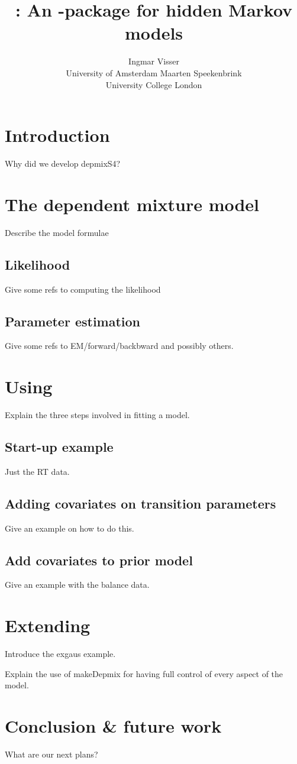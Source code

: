 \documentclass[article]{jss}
\author{Ingmar Visser\\University of Amsterdam \And 
        Maarten Speekenbrink\\University College London }
\title{\pkg{depmixS4}: An \proglang{R}-package for hidden Markov models}
\begin{document}

\section[]{Introduction}

Why did we develop depmixS4?

\section{The dependent mixture model}

Describe the model formulae

\subsection{Likelihood}

Give some refs to computing the likelihood

\subsection{Parameter estimation}

Give some refs to EM/forward/backbward and possibly others.


\section{Using }

Explain the three steps involved in fitting a model. 


\subsection{Start-up example}

Just the RT data.


\subsection{Adding covariates on transition parameters}


Give an example on how to do this.


\subsection{Add covariates to prior model}

Give an example with the balance data. 

\section{Extending }

Introduce the exgaus example. 

Explain the use of makeDepmix for having full control of every aspect of the model. 


\section{Conclusion \& future work}


What are our next plans?



\end{document}
